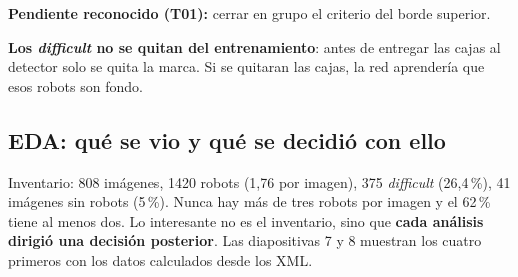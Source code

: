 \documentclass[11pt,a4paper]{article}
\begin{document}
\textbf{Pendiente reconocido (T01):} cerrar en grupo el criterio del borde superior.

\textbf{Los \emph{difficult} no se quitan del entrenamiento}: antes de entregar las cajas al detector solo se quita la marca. Si se quitaran las cajas, la red aprendería que esos robots son fondo.

\subsection{EDA: qué se vio y qué se decidió con ello}
Inventario: 808 imágenes, 1420 robots (1,76 por imagen), 375 \emph{difficult} (26,4\,\%), 41 imágenes sin robots (5\,\%). Nunca hay más de tres robots por imagen y el 62\,\% tiene al menos dos. Lo interesante no es el inventario, sino que \textbf{cada análisis dirigió una decisión posterior}. Las diapositivas 7 y 8 muestran los cuatro primeros con los datos calculados desde los XML.
\end{document}
